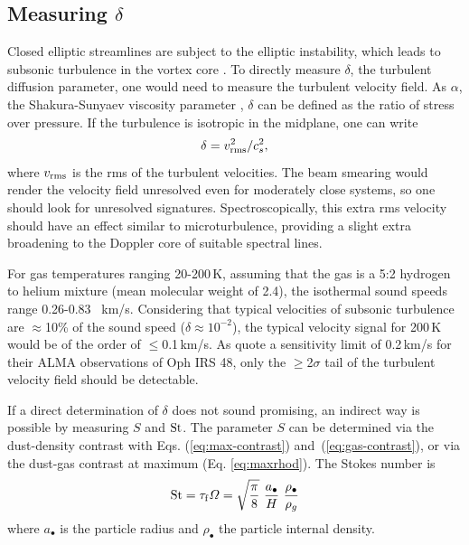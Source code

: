 \documentclass[apj]{emulateapj}
\def\blue#1{\textcolor{blue}{ #1}}
\newcommand{\Eqs}[2]{Eqs. (\ref{#1}) and~(\ref{#2})}
\newcommand{\eqs}[2]{\Eqs{#1}{#2}}
\newcommand{\eqp}[1]{(Eq. \ref{#1})}
\newcommand{\beq}{\begin{equation}}
\newcommand{\eeq}{\end{equation}}
\newcommand{\tauf}{\tau_{\rm f}}
\newcommand{\St}{{\rm St}}
\begin{document}

\subsection{Measuring $\delta$}

Closed elliptic streamlines are subject to the elliptic
instability, which leads to subsonic turbulence in the vortex core 
\citep{Lesur-Papaloizou10,Lyra-Klahr11}. To directly measure $\delta$, 
the turbulent diffusion parameter, one would need to measure the 
turbulent velocity field. As $\alpha$, the Shakura-Sunyaev viscosity
parameter \citep{Shakura-Sunyaev73}, $\delta$ can be
defined as the ratio of stress over pressure. If the turbulence is
isotropic in the midplane, one can write 
\beq
\delta = v_{\rm  rms}^2/c_s^2,
\eeq where $v_{\rm rms}$ is the rms of the turbulent velocities. 
The beam smearing would render the velocity field 
unresolved even for moderately close systems, so one should 
look for unresolved signatures. Spectroscopically, this extra rms velocity should have 
an effect similar to microturbulence, providing a slight extra
broadening to the Doppler core of suitable spectral lines.

For gas temperatures ranging 20-200\,K, assuming that the gas is a 5:2 hydrogen to
helium mixture (mean molecular weight of 2.4), the isothermal sound
speeds range 0.26-0.83 \, km/s. Considering that typical velocities of subsonic
turbulence are $\approx$10\% of the sound speed ($\delta \approx
10^{-2}$), the typical velocity signal for 200\,K would be of the order
of $\leq$0.1\,km/s. As \cite{vanderMarel13} quote a
sensitivity limit of 0.2\,km/s for their ALMA observations of
Oph IRS 48, only the $\geq$2$\sigma$ tail of the turbulent velocity field
should be detectable.

If a direct determination of $\delta$ does not sound promising,
  an indirect way is possible by measuring $S$ and $\St$. The
  parameter $S$ can be determined via the dust-density
  contrast with \eqs{eq:max-contrast}{eq:gas-contrast}, or via the
  dust-gas contrast at maximum \eqp{eq:maxrhod}. The Stokes number is 
\beq
    \St = \tauf  \varOmega = \sqrt{\frac{\pi}{8}} \
    \frac{a_\bullet}{H} \ \frac{\rho_\bullet}{\rho_g}
\eeq
\noindent where $a_\bullet$ is the particle radius and $\rho_\bullet$ the
particle internal density.

\end{document}
